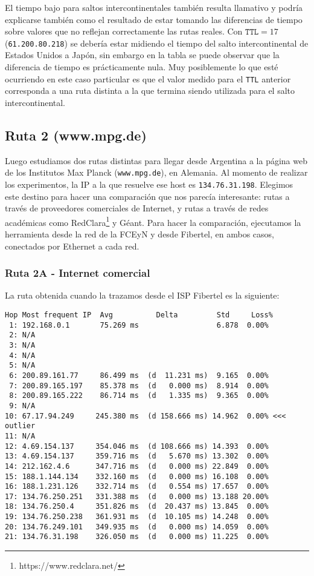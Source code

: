 El tiempo bajo para saltos intercontinentales también resulta llamativo y podría
explicarse también como el resultado de estar tomando las diferencias de tiempo
sobre valores que no reflejan correctamente las rutas reales. Con $\texttt{TTL}
= 17$ (\texttt{61.200.80.218}) se debería estar midiendo el tiempo del salto
intercontinental de Estados Unidos a Japón, sin embargo en la tabla se puede
observar que la diferencia de tiempo es prácticamente nula. Muy posiblemente lo
que esté ocurriendo en este caso particular es que el valor medido para el
\texttt{TTL} anterior corresponda a una ruta distinta a la que termina siendo
utilizada para el salto intercontinental.


\subsection{Ruta 2 (www.mpg.de)}

Luego estudiamos dos rutas distintas para llegar desde Argentina a la página web de los Institutos Max Planck (\texttt{www.mpg.de}), en Alemania. Al momento de realizar los experimentos, la IP a la que resuelve ese host es \texttt{134.76.31.198}. Elegimos este destino para hacer una comparación que nos parecía interesante: rutas a través de proveedores comerciales de Internet, y rutas a través de redes académicas como RedClara\footnote{https://www.redclara.net/} y Géant. Para hacer la comparación, ejecutamos la herramienta desde la red de la FCEyN y desde Fibertel, en ambos casos, conectados por Ethernet a cada red.

\subsubsection{Ruta 2A - Internet comercial}


La ruta obtenida cuando la trazamos desde el ISP Fibertel es la siguiente:

\begin{Verbatim}[fontsize=\scriptsize]
Hop Most frequent IP  Avg          Delta         Std     Loss%
 1: 192.168.0.1       75.269 ms                  6.878  0.00% 
 2: N/A            
 3: N/A            
 4: N/A            
 5: N/A            
 6: 200.89.161.77     86.499 ms  (d  11.231 ms)  9.165  0.00% 
 7: 200.89.165.197    85.378 ms  (d   0.000 ms)  8.914  0.00% 
 8: 200.89.165.222    86.714 ms  (d   1.335 ms)  9.365  0.00% 
 9: N/A            
10: 67.17.94.249     245.380 ms  (d 158.666 ms) 14.962  0.00% <<< outlier
11: N/A            
12: 4.69.154.137     354.046 ms  (d 108.666 ms) 14.393  0.00% 
13: 4.69.154.137     359.716 ms  (d   5.670 ms) 13.302  0.00% 
14: 212.162.4.6      347.716 ms  (d   0.000 ms) 22.849  0.00% 
15: 188.1.144.134    332.160 ms  (d   0.000 ms) 16.108  0.00% 
16: 188.1.231.126    332.714 ms  (d   0.554 ms) 17.657  0.00% 
17: 134.76.250.251   331.388 ms  (d   0.000 ms) 13.188 20.00% 
18: 134.76.250.4     351.826 ms  (d  20.437 ms) 13.845  0.00% 
19: 134.76.250.238   361.931 ms  (d  10.105 ms) 14.248  0.00% 
20: 134.76.249.101   349.935 ms  (d   0.000 ms) 14.059  0.00% 
21: 134.76.31.198    326.050 ms  (d   0.000 ms) 11.225  0.00%
\end{Verbatim}

